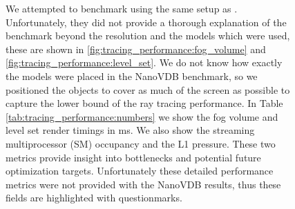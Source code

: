 \begin{figure}[H]
{\begin{tabularx}{\textwidth}{|c|X|X|X|X|X|X|}
            \hline
        \end{tabularx}
        \label{tab:tracing_performance:numbers}
    }
    \caption{We attempted to benchmark using the same setup as \cite{NanoVDBBenchmark}. Unfortunately, they did not provide a thorough explanation of the benchmark beyond the resolution and the models which were used, these are shown in \ref{fig:tracing_performance:fog_volume} and \ref{fig:tracing_performance:level_set}. We do not know how exactly the models were placed in the NanoVDB benchmark, so we positioned the objects to cover as much of the screen as possible to capture the lower bound of the ray tracing performance. In Table \ref{tab:tracing_performance:numbers} we show the fog volume and level set render timings in ms. We also show the streaming multiprocessor (SM) occupancy and the L1 pressure. These two metrics provide insight into bottlenecks and potential future optimization targets. Unfortunately these detailed performance metrics were not provided with the NanoVDB results, thus these fields are highlighted with questionmarks.}
    \label{fig:tracing_performance}
\end{figure}